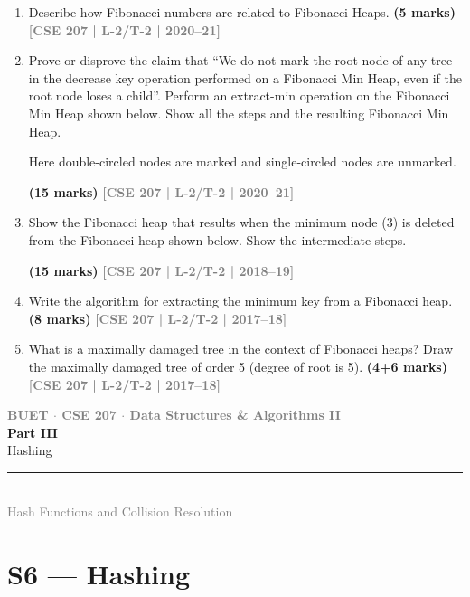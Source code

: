 \documentclass[12pt]{article}
\newcommand{\yr}[1]{\hfill\textcolor{gray}{\small\textbf{[#1]}}}
\newcommand{\mk}[1]{\textcolor{orange!70!black}{\small\textbf{(#1 marks)}}}
\newcommand{\secdivider}[5]{%
  \newpage\thispagestyle{empty}%
  \vspace*{\fill}%
  \begin{tcolorbox}[enhanced,colback=#4!7,colframe=#3,boxrule=1.5pt,arc=8pt,
    left=20pt,right=20pt,top=22pt,bottom=22pt,
    shadow={3pt}{-3pt}{0pt}{black!15}]
    \centering
    {\large\textcolor{gray}{\textbf{BUET $\cdot$ CSE 207 $\cdot$ Data Structures \& Algorithms II}}}\\[8pt]
    {\fontsize{26}{32}\selectfont\bfseries\textcolor{#3}{#1}}\\[6pt]
    {\fontsize{15}{19}\selectfont\textcolor{dgray}{#2}}\\[12pt]
    \textcolor{#3!60}{\rule{0.5\textwidth}{0.5pt}}\\[6pt]
    {\small\textcolor{gray}{#5}}
  \end{tcolorbox}%
  \vspace*{\fill}\newpage%
}
\begin{document}
\begin{enumerate}
\mk{12} \yr{CSE 207 | L-2/T-1 | 2022--23}


\item Describe how Fibonacci numbers are related to Fibonacci Heaps.
\mk{5} \yr{CSE 207 | L-2/T-2 | 2020--21}


\item Prove or disprove the claim that ``We do not mark the root node of any tree in the decrease key operation performed on a Fibonacci Min Heap, even if the root node loses a child''. Perform an extract-min operation on the Fibonacci Min Heap shown below. Show all the steps and the resulting Fibonacci Min Heap.
\begin{center}
\FigFhDecA
\end{center}
Here double-circled nodes are marked and single-circled nodes are unmarked.

\mk{15} \yr{CSE 207 | L-2/T-2 | 2020--21}


\item Show the Fibonacci heap that results when the minimum node (3) is deleted from the Fibonacci heap shown below. Show the intermediate steps.
\begin{center}
\FigFhDelA
\end{center}
\mk{15} \yr{CSE 207 | L-2/T-2 | 2018--19}


\item Write the algorithm for extracting the minimum key from a Fibonacci heap. \mk{8}
\yr{CSE 207 | L-2/T-2 | 2017--18}


\item What is a maximally damaged tree in the context of Fibonacci heaps? Draw the maximally damaged tree of order 5 (degree of root is 5). \mk{4+6}
\yr{CSE 207 | L-2/T-2 | 2017--18}



\end{enumerate}

\secdivider{Part III}{Hashing}{cC}{cC}{Hash Functions and Collision Resolution}

\section{S6 --- Hashing}
\label{sec:S6}
\end{document}

